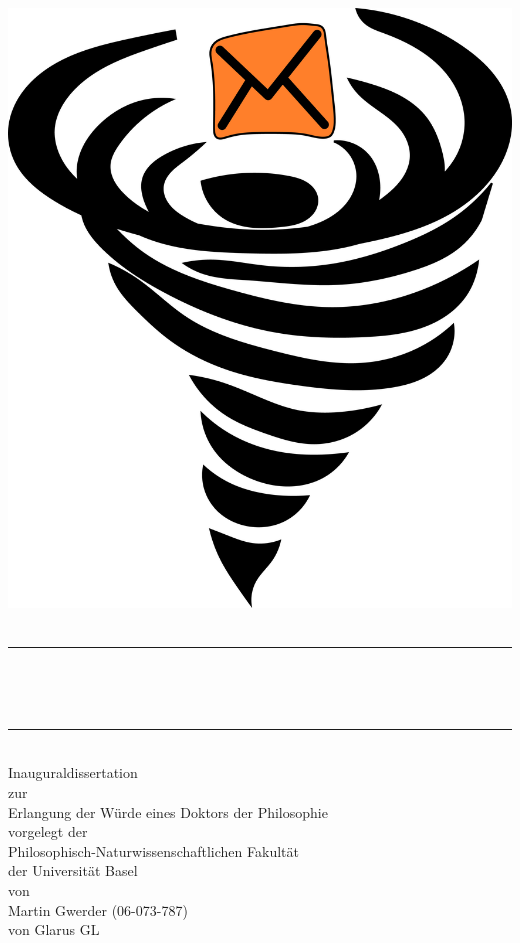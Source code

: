\begin{titlepage}
\pagecolor{gray}\afterpage{\nopagecolor}
\begin{center}~\\[1cm]
\includegraphics[height=0.4\paperwidth]{../../../../website/src/main/jbake/assets/images/MessageVortexLogo_huge}~\\[1cm]

\newcommand{\HRule}{\rule{\linewidth}{0.5mm}}
\HRule \\[0.4cm]
{ \huge \bfseries \makeatletter\@title\par\normalsize\@subtitle\makeatother \\[0.4cm] }

\HRule \\[4.5cm]

{\large Inauguraldissertation}\\
zur\\
Erlangung der W\"urde eines Doktors der Philosophie\\
vorgelegt der\\
Philosophisch-Naturwissenschaftlichen Fakult\"at\\
der Universit\"at Basel\\
von\\
Martin Gwerder (06-073-787)\\
von Glarus GL\\


\end{center}
\end{titlepage}
